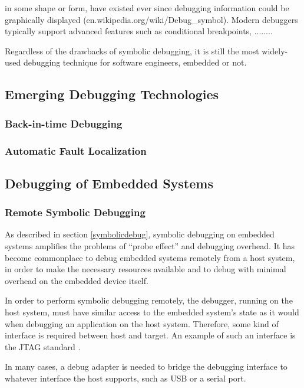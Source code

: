  in some shape or form, have existed ever since debugging information could be graphically displayed (en.wikipedia.org/wiki/Debug\_symbol). Modern debuggers typically support advanced features such as conditional breakpoints, ........
 
 Regardless of the drawbacks of symbolic debugging, it is  still the most widely-used debugging technique for software engineers, embedded or not.

\subsection{Emerging Debugging Technologies}
\label{emergingtechnologies}
\subsubsection{Back-in-time Debugging}
\label{backintime}
\subsubsection{Automatic Fault Localization}
\label{autofault}

\subsection{Debugging of Embedded Systems}
\label{debugembedded}

\subsubsection{Remote Symbolic Debugging}
\label{debugembeddedsymbolic}

As described in section \ref{symbolicdebug}, symbolic debugging on embedded systems amplifies the problems of ``probe effect'' and debugging overhead. It has become commonplace to debug embedded systems remotely from a host system, in order to make the necessary resources available and to debug with minimal overhead on the embedded device itself.

In order to perform symbolic debugging remotely, the debugger, running on the host system, must have similar access to the embedded system's state as it would when debugging  an application on the host system. Therefore, some kind of interface is required between host and target. An example of such an interface is the  JTAG standard .

In many cases, a debug adapter is needed to bridge the debugging interface to whatever interface the host supports, such as USB or a serial port.

